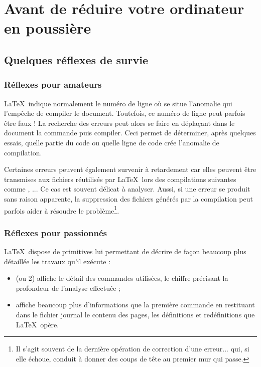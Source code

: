 
\chapter{Avant de réduire votre ordinateur en poussière}  \label{erreur}

\section{Quelques réflexes de survie}

\subsection{Réflexes pour amateurs}

\LaTeX\ indique normalement le numéro de ligne où se situe l'anomalie qui l'empêche de compiler le document. Toutefois, ce numéro de ligne peut parfois être faux ! La recherche des erreurs peut alors se faire en déplaçant dans le document la commande  puis compiler. Ceci permet de déterminer, après quelques essais, quelle partie du code ou quelle ligne de code crée l'anomalie de compilation.

Certaines erreurs peuvent également survenir à retardement car elles peuvent être transmises aux fichiers réutilisés par \LaTeX\ lors des compilations suivantes comme , ... Ce cas est souvent délicat à analyser. Aussi, si une erreur se produit sans raison apparente, la suppression des fichiers générés par la compilation peut parfois aider à résoudre le problème\footnote{Il s'agit souvent de la dernière opération de correction d'une erreur... qui, si elle échoue, conduit à donner des coups de tête au premier mur qui passe.}. 

\subsection{Réflexes pour passionnés}

\LaTeX\ dispose de primitives lui permettant de décrire de façon beaucoup plus détaillée les travaux qu'il exécute :
\begin{itemize}
\item {} (ou 2) affiche le détail des commandes utilisées, le chiffre précisant la profondeur de l'analyse effectuée ; 
\item {} affiche beaucoup plus d'informations que la première commande en restituant dans le fichier journal le contenu des pages, les définitions et redéfinitions que \LaTeX\ opère.  
\end{itemize}

